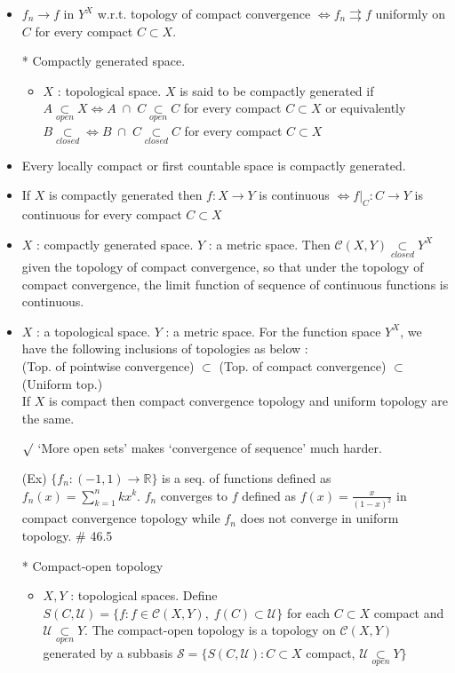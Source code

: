 \documentclass[12pt]{article}
\newcommand{\rmk}{$\surd$}
\newcommand{\Real}{\mathbb{R}}
\newcommand{\U}{\mathcal{U}}
\newcommand{\C}{\mathcal{C}}
\newcommand{\open}{\underset{open}{\subset}}
\newcommand{\closed}{\underset{closed}{\subset}}
\begin{document}
\begin{itemize}
\begin{itemize}
	\end{itemize}
	\item $f_n\rightarrow f$ in $Y^X$ w.r.t. topology of compact convergence $\Leftrightarrow f_n\rightrightarrows f$ uniformly on $C$ for every compact $C\subset X$.  
	\item[*] Compactly generated space.
	\begin{itemize}
		\item $X$ : topological space. $X$ is said to be compactly generated if \\ $A\open X \Leftrightarrow A\;\cap \;C\open C$ for every compact $C\subset X$ or equivalently \\ $B\closed \Leftrightarrow B\; \cap \; C \closed C$ for every compact $C\subset X$
	\end{itemize} 
	\item Every locally compact or first countable space is compactly generated.
	\item If $X$ is compactly generated then $f:X\rightarrow Y$ is continuous $\Leftrightarrow f|_C : C\rightarrow Y$ is continuous for every compact $C\subset X$
	\item $X$ : compactly generated space. $Y$ : a metric space. Then $\C(X,Y)\closed Y^X$ given the topology of compact convergence, so that under the topology of compact convergence, the limit function of sequence of continuous functions is continuous.
	\item $X$ : a topological space. $Y$ : a metric space. For the function space $Y^X$, we have the following inclusions of topologies as below : \\ (Top. of pointwise convergence) $\subset$ (Top. of compact convergence) $\subset$ (Uniform top.) \\ If $X$ is compact then compact convergence topology and uniform topology are the same.
	\item[\rmk] `More open sets' makes `convergence of sequence' much harder.
	\item[(Ex)] $\{f_n : (-1,1)\rightarrow \Real \}$ is a seq. of functions defined as $f_n(x)=\sum_{k=1}^n kx^k$. $f_n$ converges to $f$ defined as $f(x)=\frac{x}{(1-x)^2}$ in compact convergence topology while $f_n$ does not converge in uniform topology. \quad \# 46.5
	\item[*]Compact-open topology
	\begin{itemize}
		\item $X, Y$ : topological spaces. Define $S(C, \U)=\{f : f\in \C(X, Y), \; f(C)\subset \U\}$ for each $C\subset X$ compact and $\U\open Y$. The compact-open topology is a topology on $\C(X,Y)$ generated by a subbasis $\mathcal{S}=\{S(C, \U): C\subset X$ compact,\; $\U\open Y \}$

\end{itemize}
\end{itemize}
\end{document}

